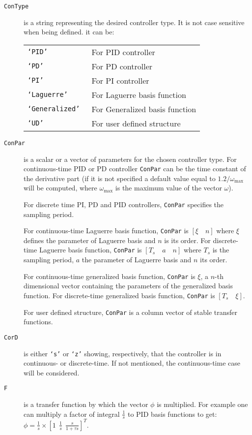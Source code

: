 \documentclass [12pt , a4paper] {report}
\begin{document}
\begin{description}
\item[\texttt{ConType}] is a string representing the desired controller type. It is not case sensitive when being defined. it can be:

  \begin{tabular}{ll}
       {\tt `PID'}     &    For PID controller \\
      {\tt `PD' }       & For PD controller\\
       {\tt `PI' }        &  For PI controller\\
      {\tt  `Laguerre' }  &  For Laguerre basis function\\
      {\tt  `Generalized' }  & For Generalized basis function\\
       {\tt `UD'}        &   For user defined structure
\end{tabular}

\item[\texttt{ConPar}]  is a scalar or a vector of parameters for the chosen controller type.
For continuous-time PID or PD controller {\tt ConPar} can be the time constant
       of the derivative part (if it is not specified a default value equal to $1.2/\omega_{\max}$ will be computed, where $\omega_{\max}$ is the maximum value of the vector $\omega$).

For discrete time PI, PD and PID controllers, {\tt ConPar} specifies the sampling period.

For continuous-time  Laguerre basis function, {\tt ConPar} is $[\xi \quad n]$ where $\xi$ defines the parameter of 
       Laguerre basis and $n$ is its order. For discrete-time Laguerre basis function, {\tt ConPar} is 
       $[T_s \quad a \quad n]$ where $T_s$ is the sampling period, $a$ the parameter of Laguerre basis and $n$ its order.
       
       For continuous-time generalized basis function, {\tt ConPar} is $\xi$, a $n$-th
       dimensional vector containing the parameters of the generalized basis
       function. For discrete-time generalized basis function, {\tt ConPar} is
       $[T_s \quad \xi]$.

       For user defined structure, {\tt ConPar} is a column vector of stable
       transfer functions.

\item[\texttt{CorD}] is either \texttt{`s'} or \texttt{`z'} showing, respectively, that the controller is in continuous- or discrete-time. If not mentioned, the continuous-time case will be considered. 

\item[\texttt{F}] is a transfer function by which the vector $\phi$ is multiplied. For example one can multiply a factor of integral $\frac{1}{s}$ to PID basis functions to get: $\phi=\frac{1}{s} \times [1\:\: \frac{1}{s} \:\: \frac{s}{1+\tau s}]^T$. 

\end{description}
\end{document}
